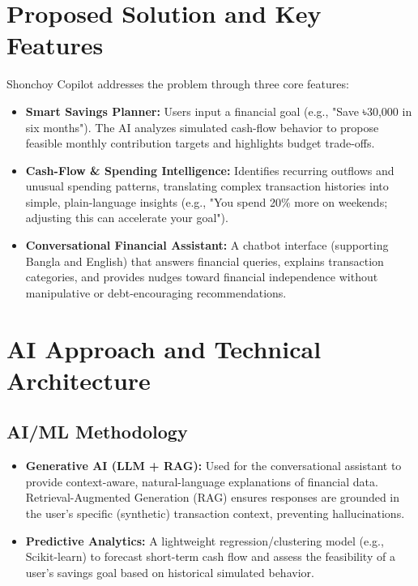\documentclass[11pt, a4paper]{article}
\begin{document}
\section{Proposed Solution and Key Features}
Shonchoy Copilot addresses the problem through three core features:
\begin{itemize}[leftmargin=*]
    \item \textbf{Smart Savings Planner:} Users input a financial goal (e.g., "Save ৳30,000 in six months"). The AI analyzes simulated cash-flow behavior to propose feasible monthly contribution targets and highlights budget trade-offs.
    \item \textbf{Cash-Flow \& Spending Intelligence:} Identifies recurring outflows and unusual spending patterns, translating complex transaction histories into simple, plain-language insights (e.g., "You spend 20\% more on weekends; adjusting this can accelerate your goal").
    \item \textbf{Conversational Financial Assistant:} A chatbot interface (supporting Bangla and English) that answers financial queries, explains transaction categories, and provides nudges toward financial independence without manipulative or debt-encouraging recommendations.
\end{itemize}

\newpage

\section{AI Approach and Technical Architecture}
\subsection{AI/ML Methodology}
\begin{itemize}[leftmargin=*]
    \item \textbf{Generative AI (LLM + RAG):} Used for the conversational assistant to provide context-aware, natural-language explanations of financial data. Retrieval-Augmented Generation (RAG) ensures responses are grounded in the user's specific (synthetic) transaction context, preventing hallucinations.
    \item \textbf{Predictive Analytics:} A lightweight regression/clustering model (e.g., Scikit-learn) to forecast short-term cash flow and assess the feasibility of a user's savings goal based on historical simulated behavior.
\end{itemize}
\end{document}
